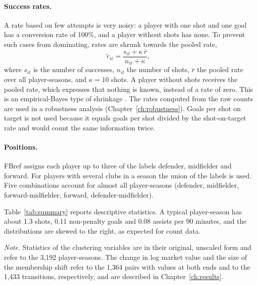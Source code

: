 \paragraph{Success rates.} A rate based on few attempts is very noisy: a player with one shot and one goal has a conversion rate of 100\%, and a player without shots has none. To prevent such cases from dominating, rates are shrunk towards the pooled rate,
\begin{equation}
	\tilde r_{it}=\frac{s_{it}+\kappa\,\bar r}{n_{it}+\kappa},
\end{equation}
where $s_{it}$ is the number of successes, $n_{it}$ the number of shots, $\bar r$ the pooled rate over all player-seasons, and $\kappa=10$ shots. A player without shots receives the pooled rate, which expresses that nothing is known, instead of a rate of zero. This is an empirical-Bayes type of shrinkage \cite{efron1975stein}. The rates computed from the raw counts are used in a robustness analysis (Chapter~\ref{ch:robustness}). Goals per shot on target is not used because it equals goals per shot divided by the shot-on-target rate and would count the same information twice.

\paragraph{Positions.} FBref assigns each player up to three of the labels defender, midfielder and forward. For players with several clubs in a season the union of the labels is used. Five combinations account for almost all player-seasons (defender, midfielder, forward-midfielder, forward, defender-midfielder).

Table~\ref{tab:summary} reports descriptive statistics. A typical player-season has about 1.3 shots, 0.11 non-penalty goals and 0.08 assists per 90 minutes, and the distributions are skewed to the right, as expected for count data.

\begin{table}[ht]
	\centering
	\small
	\caption{Descriptive statistics}
	\label{tab:summary}
	\resizebox{\textwidth}{!}{}
	\par\smallskip
	\parbox{0.95\textwidth}{\footnotesize\emph{Note.} Statistics of the clustering variables are in their original, unscaled form and refer to the 3,192 player-seasons. The change in log market value and the size of the membership shift refer to the 1,364 pairs with values at both ends and to the 1,433 transitions, respectively, and are described in Chapter~\ref{ch:results}.}
\end{table}

